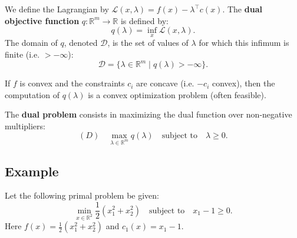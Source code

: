 \begin{definition}
    We define the Lagrangian by $\mathcal{L}(x, \lambda) = f(x) - \lambda^\top c(x)$.
    The \textbf{dual objective function} $q: \mathbb{R}^m \to \mathbb{R}$ is defined by:
    \begin{equation}
        q(\lambda) = \inf_x \mathcal{L}(x, \lambda).
    \end{equation}
    The domain of $q$, denoted $\mathcal{D}$, is the set of values of $\lambda$ for which this infimum is finite (i.e. $> -\infty$):
    \begin{equation}
        \mathcal{D} = \{ \lambda \in \mathbb{R}^m \mid q(\lambda) > -\infty \}.
    \end{equation}
\end{definition}

If $f$ is convex and the constraints $c_i$ are concave (i.e. $-c_i$ convex), then the computation of $q(\lambda)$ is a convex optimization problem (often feasible).

\begin{definition}
    The \textbf{dual problem} consists in maximizing the dual function over non-negative multipliers:
    \begin{equation}
        (D) \quad \max_{\lambda \in \mathbb{R}^m} q(\lambda) \quad \text{subject to} \quad \lambda \geq 0.
    \end{equation}
\end{definition}

\subsection{Example}

Let the following primal problem be given:
\begin{equation}
    \min_{x \in \mathbb{R}^2} \frac{1}{2}(x_1^2 + x_2^2) \quad \text{subject to} \quad x_1 - 1 \geq 0.
\end{equation}
Here $f(x) = \frac{1}{2}(x_1^2 + x_2^2)$ and $c_1(x) = x_1 - 1$.

